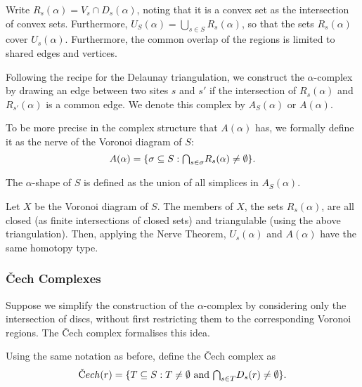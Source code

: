 Write $R_s(\alpha) = V_s \cap D_s(\alpha)$, noting that it is a convex set as the intersection of convex sets. Furthermore, $U_S(\alpha) = \bigcup_{s \in S} R_s(\alpha)$, so that the sets $R_s(\alpha)$ cover $U_s(\alpha)$. Furthermore, the common overlap of the regions is limited to shared edges and vertices.

Following the recipe for the Delaunay triangulation, we construct the $\alpha$-complex by drawing an edge between two sites $s$ and $s'$ if the intersection of $R_s(\alpha)$ and $R_{s'}(\alpha)$ is a common edge. We denote this complex by $A_S(\alpha)$ or $A(\alpha)$.

\begin{definition}
To be more precise in the complex structure that $A(\alpha)$ has, we formally define it as the nerve of the Voronoi diagram of $S$:
$$
A(\alpha) = \{\sigma \subseteq S : \mathsmaller{\bigcap}_{s \in \sigma}R_s(\alpha) \not= \emptyset\}.
$$
\end{definition}

\begin{definition}
The $\alpha$-shape of $S$ is defined as the union of all simplices in $A_{S}(\alpha)$.
\end{definition}

Let $X$ be the Voronoi diagram of $S$. The members of $X$, the sets $R_s(\alpha)$, are all closed (as finite intersections of closed sets) and triangulable (using the above triangulation). Then, applying the Nerve Theorem, $U_s(\alpha)$ and $A(\alpha)$ have the same homotopy type.


\subsubsection{\v{C}ech Complexes}

Suppose we simplify the construction of the $\alpha$-complex by considering only the intersection of discs, without first restricting them to the corresponding Voronoi regions. The \v{C}ech complex formalises this idea.

\begin{definition}
Using the same notation as before, define the \v{C}ech complex as
$$
\text{\v{C}}ech(r) = \{T \subseteq S : T \not= \emptyset \text{ and } \mathsmaller{\bigcap}_{s \in T} D_s(r) \not = \emptyset\}.
$$
\end{definition}

